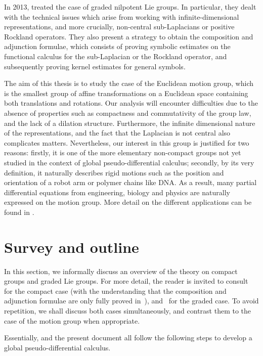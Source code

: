 In 2013,
\citeauthor{FischerRuzhansky12} treated the case of graded nilpotent Lie groups.
In particular,
they dealt with the technical issues which arise from working with infinite-dimensional representations,
and more crucially,
non-central sub-Laplacians or positive Rockland operators.
They also present a strategy to obtain the composition and adjunction formulae,
which consists of proving symbolic estimates on the functional calculus for the sub-Laplacian or the Rockland operator,
and subsequently proving kernel estimates for general symbols.

The aim of this thesis is to study the case of the Euclidean motion group,
which is the smallest group of affine transformations on a Euclidean space containing both translations and rotations.
Our analysis will encounter difficulties due to the absence of properties such as compactness and commutativity of the group law,
and the lack of a dilation structure.
Furthermore, the infinite dimensional nature of the representations,
and the fact that the Laplacian is not central also complicates matters.
Nevertheless, our interest in this group is justified for two reasons:
firstly, it is one of the more elementary non-compact groups not yet studied in the context of global pseudo-differential calculus;
secondly, by its very definition,
it naturally describes rigid motions such as the position and orientation of a robot arm or polymer chains like DNA.
As a result,
many partial differential equations from engineering, biology and physics
are naturally expressed on the motion group.
More detail on the different applications can be found in \cite{ChirikjianWang04,ChirikjianKyatkin00,Chirikjian13}.

\section{Survey and outline}

In this section,
we informally discuss an overview of the theory on compact groups and graded Lie groups.
For more detail,
the reader is invited to consult~\cite{RuzhanskyTurunen10} for the compact case
(with the understanding that the composition and adjunction formulae are only fully proved in~\cite{Fischer2015}),
and~\cite{FischerRuzhansky16} for the graded case.
To avoid repetition,
we shall discuss both cases simultaneously,
and contrast them to the case of the motion group when appropriate.

Essentially,
\cite{Fischer2015,FischerRuzhansky16} and the present document
all follow the following steps
to develop a global pseudo-differential calculus.

